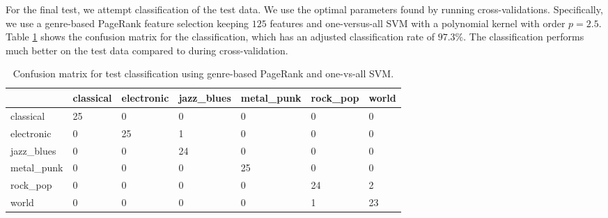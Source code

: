 \documentclass[12pt]{article}
\begin{document}

For the final test, we attempt classification of the test data.  We use the optimal parameters found by running cross-validations.  Specifically, we use a genre-based PageRank feature selection keeping $125$ features and one-versus-all SVM with a polynomial kernel with order $p=2.5$.  Table \ref{tab:class} shows the confusion matrix for the classification, which has an adjusted classification rate of $97.3\%$.  The classification performs much better on the test data compared to during cross-validation.

\begin{table}[h!]
   \centering
   \begin{tabular}{ l||l | l | l | l | l | l | }
   & classical & electronic & jazz\_blues & metal\_punk & rock\_pop & world\\\hline
   classical & 25 &0 &0 &0 &0 &0 \\ \hline 
   electronic & 0 &25 &1 &0 &0 &0 \\ \hline 
   jazz\_blues & 0 &0 &24 &0 &0 &0 \\ \hline 
   metal\_punk & 0 &0 &0 &25 &0 &0 \\ \hline 
   rock\_pop & 0 &0 &0 &0 &24 &2 \\ \hline 
   world & 0 &0 &0 &0 &1 &23 \\ \hline 
   \end{tabular}
   \caption{Confusion matrix for test classification using genre-based PageRank and one-vs-all SVM.}
   \label{tab:class}
\end{table}
\end{document}
